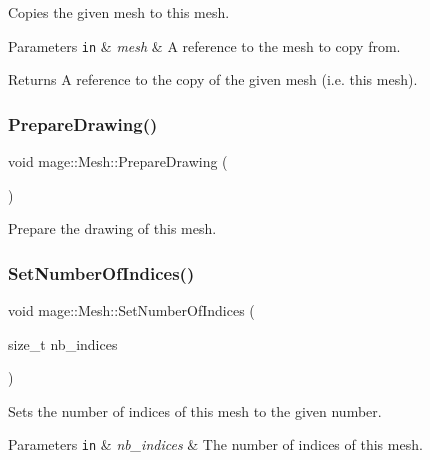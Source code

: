 Copies the given mesh to this mesh.


\begin{DoxyParams}[1]{Parameters}
\mbox{\tt in}  & {\em mesh} & A reference to the mesh to copy from. \\
\hline
\end{DoxyParams}
\begin{DoxyReturn}{Returns}
A reference to the copy of the given mesh (i.\+e. this mesh). 
\end{DoxyReturn}
\hypertarget{classmage_1_1_mesh_a4e3a8055985afc9fbfa8792d848761d6}{}\label{classmage_1_1_mesh_a4e3a8055985afc9fbfa8792d848761d6} 
\subsubsection{\texorpdfstring{Prepare\+Drawing()}{PrepareDrawing()}}
{\footnotesize\ttfamily void mage\+::\+Mesh\+::\+Prepare\+Drawing (\begin{DoxyParamCaption}{ }\end{DoxyParamCaption})}

Prepare the drawing of this mesh. \hypertarget{classmage_1_1_mesh_a19336d13ef5219c196678b8fdf4cca2b}{}\label{classmage_1_1_mesh_a19336d13ef5219c196678b8fdf4cca2b} 
\subsubsection{\texorpdfstring{Set\+Number\+Of\+Indices()}{SetNumberOfIndices()}}
{\footnotesize\ttfamily void mage\+::\+Mesh\+::\+Set\+Number\+Of\+Indices (\begin{DoxyParamCaption}\item[{size\+\_\+t}]{nb\+\_\+indices }\end{DoxyParamCaption})\hspace{0.3cm}{\ttfamily [protected]}}

Sets the number of indices of this mesh to the given number.


\begin{DoxyParams}[1]{Parameters}
\mbox{\tt in}  & {\em nb\+\_\+indices} & The number of indices of this mesh. \\
\hline
\end{DoxyParams}
\hypertarget{classmage_1_1_mesh_a7d871e56f4489e7aa0557688662589bb}{}\label{classmage_1_1_mesh_a7d871e56f4489e7aa0557688662589bb} 
